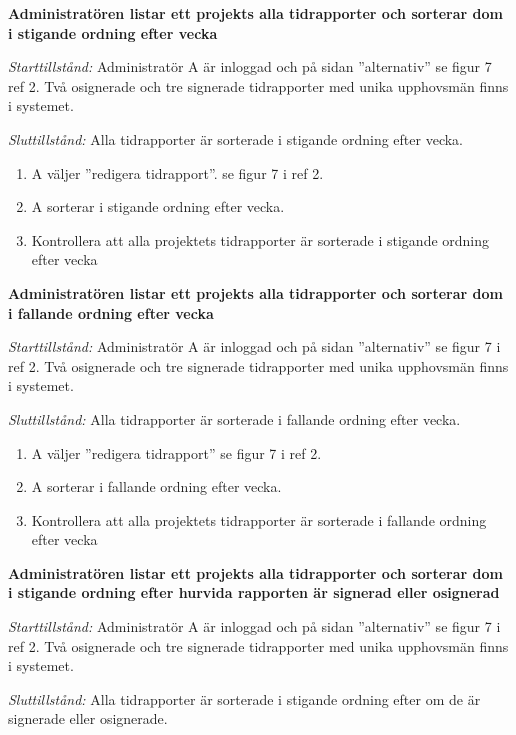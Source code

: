 \documentclass[a4paper]{article}
\begin{document}
\begin{FT}
\item %
\textbf{Administratören listar ett projekts alla tidrapporter och sorterar dom i stigande ordning efter vecka}

\emph{Starttillstånd:} Administratör A är inloggad och på sidan ''alternativ'' se figur 7 ref 2. Två osignerade och tre signerade tidrapporter med unika upphovsmän finns i systemet.

\emph{Sluttillstånd:} Alla tidrapporter är sorterade i stigande ordning efter vecka.

\begin{enumerate}
\item A väljer ''redigera tidrapport''. se figur 7 i ref 2.
\item A sorterar i stigande ordning efter vecka.
\item Kontrollera att alla projektets tidrapporter är sorterade i stigande ordning efter vecka
\end{enumerate}

\item %
\textbf{Administratören listar ett projekts alla tidrapporter och sorterar dom i fallande ordning efter vecka}

\emph{Starttillstånd:} Administratör A är inloggad och på sidan ''alternativ'' se figur 7 i ref 2. Två osignerade och tre signerade tidrapporter med unika upphovsmän finns i systemet.

\emph{Sluttillstånd:} Alla tidrapporter är sorterade i fallande ordning efter vecka.

\begin{enumerate}
\item A väljer ''redigera tidrapport'' se figur 7 i ref 2.
\item A sorterar i fallande ordning efter vecka.
\item Kontrollera att alla projektets tidrapporter är sorterade i fallande ordning efter vecka
\end{enumerate}

\item %
\textbf{Administratören listar ett projekts alla tidrapporter och sorterar dom i stigande ordning efter hurvida rapporten är signerad eller osignerad}

\emph{Starttillstånd:} Administratör A är inloggad och på sidan ''alternativ'' se figur 7 i ref 2. Två osignerade och tre signerade tidrapporter med unika upphovsmän finns i systemet.

\emph{Sluttillstånd:} Alla tidrapporter är sorterade i stigande ordning efter om de är signerade eller osignerade.


\end{FT}
\end{document}

